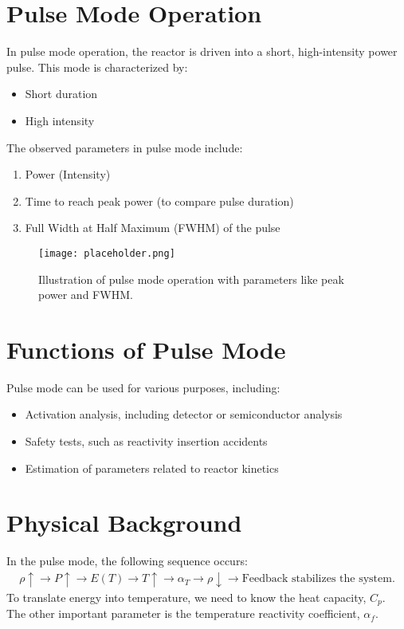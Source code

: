 \section{Pulse Mode Operation}
In pulse mode operation, the reactor is driven into a short, high-intensity power pulse. This mode is characterized by:
\begin{itemize}
    \item Short duration
    \item High intensity
\end{itemize}
The observed parameters in pulse mode include:
\begin{enumerate}
    \item Power (Intensity)
    \item Time to reach peak power (to compare pulse duration)
    \item Full Width at Half Maximum (FWHM) of the pulse
\end{enumerate}

\begin{figure}[h]
    \centering
    \texttt{[image: placeholder.png]}
    \caption{Illustration of pulse mode operation with parameters like peak power and FWHM.}
    \label{fig:pulse_mode}
\end{figure}

\section{Functions of Pulse Mode}
Pulse mode can be used for various purposes, including:
\begin{itemize}
    \item Activation analysis, including detector or semiconductor analysis
    \item Safety tests, such as reactivity insertion accidents
    \item Estimation of parameters related to reactor kinetics
\end{itemize}

\section{Physical Background}
In the pulse mode, the following sequence occurs:
\begin{align*}
    \rho \uparrow \to P \uparrow \to E(T) \to T \uparrow \to \alpha_T \to \rho \downarrow \to \text{Feedback stabilizes the system.}
\end{align*}
To translate energy into temperature, we need to know the heat capacity, $C_p$. The other important parameter is the temperature reactivity coefficient, $\alpha_f$.

